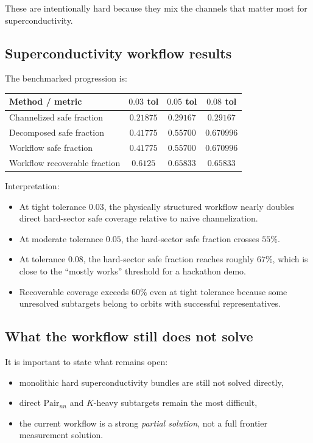 \documentclass[11pt]{article}
\begin{document}
These are intentionally hard because they mix the channels that matter most for superconductivity.

\subsection{Superconductivity workflow results}

The benchmarked progression is:

\begin{center}
\begin{tabular}{lccc}
\toprule
Method / metric & \(0.03\) tol & \(0.05\) tol & \(0.08\) tol \\
\midrule
Channelized safe fraction & \(0.21875\) & \(0.29167\) & \(0.29167\) \\
Decomposed safe fraction & \(0.41775\) & \(0.55700\) & \(0.670996\) \\
Workflow safe fraction & \(0.41775\) & \(0.55700\) & \(0.670996\) \\
Workflow recoverable fraction & \(0.6125\) & \(0.65833\) & \(0.65833\) \\
\bottomrule
\end{tabular}
\end{center}

Interpretation:

\begin{itemize}
\item At tight tolerance \(0.03\), the physically structured workflow nearly doubles direct hard-sector safe coverage relative to naive channelization.
\item At moderate tolerance \(0.05\), the hard-sector safe fraction crosses \(55\%\).
\item At tolerance \(0.08\), the hard-sector safe fraction reaches roughly \(67\%\), which is close to the ``mostly works'' threshold for a hackathon demo.
\item Recoverable coverage exceeds \(60\%\) even at tight tolerance because some unresolved subtargets belong to orbits with successful representatives.
\end{itemize}

\subsection{What the workflow still does not solve}

It is important to state what remains open:

\begin{itemize}
\item monolithic hard superconductivity bundles are still not solved directly,
\item direct \(\mathrm{Pair}_{nn}\) and \(K\)-heavy subtargets remain the most difficult,
\item the current workflow is a strong \emph{partial solution}, not a full frontier measurement solution.
\end{itemize}
\end{document}
